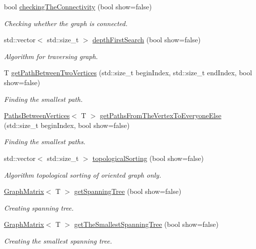 \begin{DoxyCompactItemize}
bool \mbox{\hyperlink{classgm_1_1_graph_matrix_ab91a8713c4e8ed19bedc58f1cfab2bc5}{checking\+The\+Connectivity}} (bool show=false)
\begin{DoxyCompactList}\small\item\em Checking whether the graph is connected. \end{DoxyCompactList}\item 
std\+::vector$<$ std\+::size\+\_\+t $>$ \mbox{\hyperlink{classgm_1_1_graph_matrix_a91506a78cf2efe32f6c48a7f12914a43}{depth\+First\+Search}} (bool show=false)
\begin{DoxyCompactList}\small\item\em Algorithm for traversing graph. \end{DoxyCompactList}\item 
T \mbox{\hyperlink{classgm_1_1_graph_matrix_aff0a3d3adbdcc6bce105e8c10f422a4b}{get\+Path\+Between\+Two\+Vertices}} (std\+::size\+\_\+t begin\+Index, std\+::size\+\_\+t end\+Index, bool show=false)
\begin{DoxyCompactList}\small\item\em Finding the smallest path. \end{DoxyCompactList}\item 
\mbox{\hyperlink{structpbv_1_1_paths_between_vertices}{Paths\+Between\+Vertices}}$<$ T $>$ \mbox{\hyperlink{classgm_1_1_graph_matrix_a2eb3d434634993733dfd8fb7515ca8b9}{get\+Paths\+From\+The\+Vertex\+To\+Everyone\+Else}} (std\+::size\+\_\+t begin\+Index, bool show=false)
\begin{DoxyCompactList}\small\item\em Finding the smallest paths. \end{DoxyCompactList}\item 
std\+::vector$<$ std\+::size\+\_\+t $>$ \mbox{\hyperlink{classgm_1_1_graph_matrix_a8f88b6ebce9cc1ed403d414cd173da02}{topological\+Sorting}} (bool show=false)
\begin{DoxyCompactList}\small\item\em Algorithm topological sorting of oriented graph only. \end{DoxyCompactList}\item 
\mbox{\hyperlink{classgm_1_1_graph_matrix}{Graph\+Matrix}}$<$ T $>$ \mbox{\hyperlink{classgm_1_1_graph_matrix_a490a9ef8eb86acc75c42a97cf5dbb368}{get\+Spanning\+Tree}} (bool show=false)
\begin{DoxyCompactList}\small\item\em Creating spanning tree. \end{DoxyCompactList}\item 
\mbox{\hyperlink{classgm_1_1_graph_matrix}{Graph\+Matrix}}$<$ T $>$ \mbox{\hyperlink{classgm_1_1_graph_matrix_a8e60714a5f3b6fae8c04be67bbf8b56c}{get\+The\+Smallest\+Spanning\+Tree}} (bool show=false)
\begin{DoxyCompactList}\small\item\em Creating the smallest spanning tree. \end{DoxyCompactList}\end{DoxyCompactItemize}


